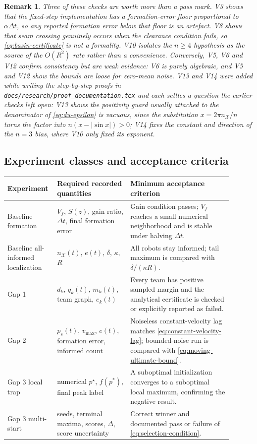\documentclass[11pt]{article}
\newtheorem{remark}{Remark}
\begin{document}
\begin{remark}
Three of these checks are worth more than a pass mark. V3 shows that the fixed-step implementation has a formation-error floor proportional to $\alpha\Delta t$, so any reported formation error below that floor is an artefact. V8 shows that seam crossing genuinely occurs when the clearance condition fails, so \eqref{eq:basin-certificate} is not a formality. V10 isolates the $n\geq4$ hypothesis as the source of the $O(R^2)$ rate rather than a convenience. Conversely, V5, V6 and V12 confirm consistency but are weak evidence: V6 is purely algebraic, and V5 and V12 show the bounds are loose for zero-mean noise. V13 and V14 were added while writing the step-by-step proofs in \texttt{docs/research/proof\_documentation.tex} and each settles a question the earlier checks left open: V13 shows the positivity guard usually attached to the denominator of \eqref{eq:du-epsilon} is vacuous, since the substitution $x=2\pi n_{\mathcal X}/n$ turns the factor into $n\left(x-\left|\sin x\right|\right)>0$; V14 fixes the constant \emph{and} direction of the $n=3$ bias, where V10 only fixed its exponent.
\end{remark}

\subsection{Experiment classes and acceptance criteria}

\begin{center}
\begin{tabular}{p{0.16\linewidth}p{0.31\linewidth}p{0.43\linewidth}}
\hline
Experiment & Required recorded quantities & Minimum acceptance criterion \\
\hline
Baseline formation & $V_f$, $S(z)$, gain ratio, $\Delta t$, final formation error & Gain condition passes; $V_f$ reaches a small numerical neighborhood and is stable under halving $\Delta t$. \\
Baseline all-informed localization & $n_{\mathcal X}(t)$, $e(t)$, $\delta$, $\kappa$, $R$ & All robots stay informed; tail maximum is compared with $\delta/(\kappa R)$. \\
Gap 1 & $d_k$, $q_k(t)$, $m_k(t)$, team graph, $e_k(t)$ & Every team has positive sampled margin and the analytical certificate is checked or explicitly reported as failed. \\
Gap 2 & $p_s(t)$, $v_{\max}$, $e(t)$, formation error, informed count & Noiseless constant-velocity lag matches \eqref{eq:constant-velocity-lag}; bounded-noise run is compared with \eqref{eq:moving-ultimate-bound}. \\
Gap 3 local trap & numerical $p^\star$, $f(p^*)$, final peak label & A suboptimal initialization converges to a suboptimal local maximum, confirming the negative result. \\
Gap 3 multi-start & seeds, terminal maxima, scores, $\Delta$, score uncertainty & Correct winner and documented pass or failure of \eqref{eq:selection-condition}. \\
\hline
\end{tabular}
\end{center}
\end{document}
